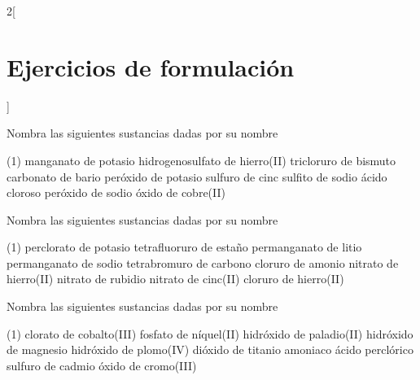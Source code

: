 \documentclass[10pt]{article}
\begin{document}
\begin{multicols}{2}[
  \section{Ejercicios de formulación}
  ]
  \begin{exercise}[
      tags    = {inorgánica,formulación,múltiple,2B},
      topics  = {química inorgánica,formulación,nomenclatura},
      source  = {Química 2B SAN 2016, p372, e15},
    ]

    Nombra las siguientes sustancias dadas por su nombre

    \begin{tasks}(1)
      \task manganato de potasio
      \task hidrogenosulfato de hierro(II)
      \task tricloruro de bismuto
      \task carbonato de bario
      \task peróxido de potasio
      \task sulfuro de cinc
      \task sulfito de sodio
      \task ácido cloroso
      \task peróxido de sodio
      \task óxido de cobre(II)
    \end{tasks}
  \end{exercise}


  \begin{exercise}[
      tags    = {inorgánica,formulación,múltiple,2B},
      topics  = {química inorgánica,formulación,nomenclatura},
      source  = {Química 2B SAN 2016, p372, e16},
    ]

    Nombra las siguientes sustancias dadas por su nombre

    \begin{tasks}(1)
      \task perclorato de potasio
      \task tetrafluoruro de estaño
      \task permanganato de litio
      \task permanganato de sodio
      \task tetrabromuro de carbono
      \task cloruro de amonio
      \task nitrato de hierro(II)
      \task nitrato de rubidio
      \task nitrato de cinc(II)
      \task cloruro de hierro(II)
    \end{tasks}
  \end{exercise}


  \begin{exercise}[
      tags    = {inorgánica,formulación,múltiple,2B},
      topics  = {química inorgánica,formulación,nomenclatura},
      source  = {Química 2B SAN 2016, p372, e17},
    ]

    Nombra las siguientes sustancias dadas por su nombre

    \begin{tasks}(1)
      \task clorato de cobalto(III)
      \task fosfato de níquel(II)
      \task hidróxido de paladio(II)
      \task hidróxido de magnesio
      \task hidróxido de plomo(IV)
      \task dióxido de titanio
      \task amoniaco
      \task ácido perclórico
      \task sulfuro de cadmio
      \task óxido de cromo(III)
    \end{tasks}
  \end{exercise}


\end{multicols}
\end{document}
